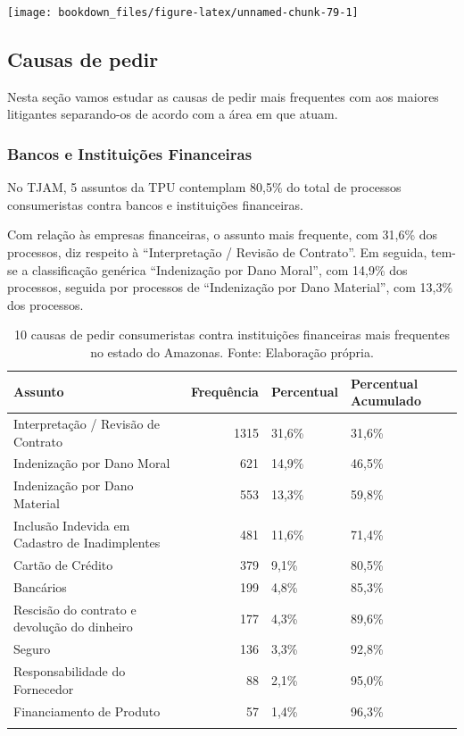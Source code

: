 \documentclass[]{report}
\begin{document}
\texttt{[image: bookdown\_files/figure-latex/unnamed-chunk-79-1]}

\subsection{Causas de pedir}\label{causas-de-pedir-6}

Nesta seção vamos estudar as causas de pedir mais frequentes com aos
maiores litigantes separando-os de acordo com a área em que atuam.

\subsubsection{Bancos e Instituições
Financeiras}\label{bancos-e-instituicoes-financeiras-6}

No TJAM, 5 assuntos da TPU contemplam 80,5\% do total de processos
consumeristas contra bancos e instituições financeiras.

Com relação às empresas financeiras, o assunto mais frequente, com
31,6\% dos processos, diz respeito à ``Interpretação / Revisão de
Contrato''. Em seguida, tem-se a classificação genérica ``Indenização
por Dano Moral'', com 14,9\% dos processos, seguida por processos de
``Indenização por Dano Material'', com 13,3\% dos processos.

\begin{longtable}{lrll}
\caption{10 causas de pedir consumeristas contra instituições financeiras mais frequentes no estado do Amazonas. Fonte: Elaboração própria.} \\
  \hline
Assunto & Frequência & Percentual & Percentual Acumulado \\
  \hline
Interpretação / Revisão de Contrato & 1315 & 31,6\% & 31,6\% \\
  Indenização por Dano Moral & 621 & 14,9\% & 46,5\% \\
  Indenização por Dano Material & 553 & 13,3\% & 59,8\% \\
  Inclusão Indevida em Cadastro de Inadimplentes & 481 & 11,6\% & 71,4\% \\
  Cartão de Crédito & 379 & 9,1\% & 80,5\% \\
  Bancários & 199 & 4,8\% & 85,3\% \\
  Rescisão do contrato e devolução do dinheiro & 177 & 4,3\% & 89,6\% \\
  Seguro & 136 & 3,3\% & 92,8\% \\
  Responsabilidade do Fornecedor &  88 & 2,1\% & 95,0\% \\
  Financiamento de Produto &  57 & 1,4\% & 96,3\% \\
   \hline
\hline
\label{unnamed-chunk-81}
\end{longtable}
\end{document}
